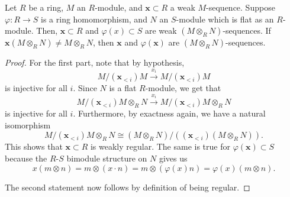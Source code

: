 \documentclass[12pt]{article}
\begin{document}
\begin{prop} \label{prop:regularity-flat-tensor}
	Let $R$ be a ring, $M$ an $R$-module, and $\mathbf{x} \subset R$ a weak $M$-sequence. Suppose $\varphi : R \to S$ is a ring homomorphism, and $N$ an $S$-module which is flat as an $R$-module. \newline
	Then, $\mathbf{x} \subset R$ and $\varphi(x) \subset S$ are weak $(M \otimes_{R} N)$-sequences. \newline
	If $\mathbf{x}(M \otimes_{R} N) \neq M \otimes_{R} N$, then $\mathbf{x}$ and $\varphi(\mathbf{x})$ are $(M \otimes_{R} N)$-sequences.
\end{prop}
\begin{proof} 
	For the first part, note that by hypothesis,
	\begin{equation*} 
		M/(\mathbf{x}_{< i})M \xrightarrow{x_{i}} M/(\mathbf{x}_{< i})M
	\end{equation*}
	is injective for all $i$. Since $N$ is a flat $R$-module, we get that
	\begin{equation*} 
		M/(\mathbf{x}_{< i})M \otimes_{R} N \xrightarrow{x_{i}} M/(\mathbf{x}_{< i})M \otimes_{R} N
	\end{equation*}
	is injective for all $i$. Furthermore, by exactness again, we have a natural isomorphism
	\begin{equation*} 
		M/(\mathbf{x}_{< i})M \otimes_{R} N \cong (M \otimes_{R} N)/((\mathbf{x}_{< i})(M \otimes_{R} N)).
	\end{equation*}
	This shows that $\mathbf{x} \subset R$ is weakly regular. The same is true for $\varphi(\mathbf{x}) \subset S$ because the $R$-$S$ bimodule structure on $N$ gives us
	\begin{equation*} 
		x (m \otimes n) = m \otimes (x \cdot n) = m \otimes (\varphi(x) n) = \varphi(x)(m \otimes n).
	\end{equation*}

	The second statement now follows by definition of being regular.
\end{proof}
\end{document}
